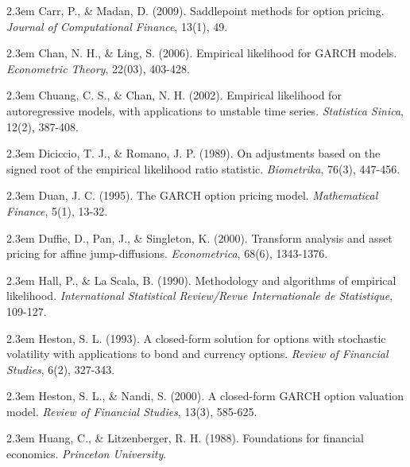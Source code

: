 \documentclass[oneside,english]{amsbook}
\numberwithin{section}{chapter}
\numberwithin{equation}{section}
\numberwithin{figure}{section}
\theoremstyle{plain}
\theoremstyle{plain}
\theoremstyle{definition}
\theoremstyle{plain}
\theoremstyle{plain}
\theoremstyle{remark}
\theoremstyle{definition}
\theoremstyle{definition}
\begin{document}
\par\noindent\hangindent2.3em
Carr, P., \& Madan, D. (2009). Saddlepoint methods for option pricing. {\em Journal of Computational Finance}, 13(1), 49.

\par\noindent\hangindent2.3em
Chan, N. H., \& Ling, S. (2006). Empirical likelihood for GARCH models. {\em Econometric Theory}, 22(03), 403-428.

\par\noindent\hangindent2.3em
Chuang, C. S., \& Chan, N. H. (2002). Empirical likelihood for autoregressive models, with applications to unstable time series. {\em Statistica Sinica}, 12(2), 387-408.

\par\noindent\hangindent2.3em
Diciccio, T. J., \& Romano, J. P. (1989). On adjustments based on the signed root of the empirical likelihood ratio statistic. {\em Biometrika}, 76(3), 447-456.

\par\noindent\hangindent2.3em
Duan, J. C. (1995). The GARCH option pricing model. {\em Mathematical Finance}, 5(1), 13-32.

\par\noindent\hangindent2.3em
Duffie, D., Pan, J., \& Singleton, K. (2000). Transform analysis and asset pricing for affine jump-diffusions. {\em Econometrica}, 68(6), 1343-1376.

\par\noindent\hangindent2.3em
Hall, P., \& La Scala, B. (1990). Methodology and algorithms of empirical likelihood. {\em International Statistical Review/Revue Internationale de Statistique}, 109-127.

\par\noindent\hangindent2.3em
Heston, S. L. (1993). A closed-form solution for options with stochastic volatility with applications to bond and currency options. {\em Review of Financial Studies}, 6(2), 327-343.

\par\noindent\hangindent2.3em
Heston, S. L., \& Nandi, S. (2000). A closed-form GARCH option valuation model. {\em Review of Financial Studies}, 13(3), 585-625.

\par\noindent\hangindent2.3em
Huang, C., \& Litzenberger, R. H. (1988). Foundations for financial economics. {\em Princeton University}.
\end{document}

